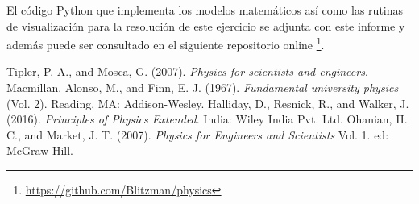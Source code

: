 \documentclass[journal]{IEEEtran}
\begin{document}
El código Python que implementa los modelos matemáticos así como las rutinas de visualización para la resolución de este ejercicio se adjunta con este informe y además puede ser consultado en el siguiente repositorio online \footnote{\url{https://github.com/Blitzman/physics}}.

\ifCLASSOPTIONcaptionsoff
  \newpage
\fi



%
%
%
\begin{thebibliography}{1}

  Tipler, P. A., and Mosca, G. (2007). \emph{Physics for scientists and engineers}. Macmillan.
  Alonso, M., and Finn, E. J. (1967). \emph{Fundamental university physics} (Vol. 2). Reading, MA: Addison-Wesley.
  Halliday, D., Resnick, R., and Walker, J. (2016). \emph{Principles of Physics Extended}. India: Wiley India Pvt. Ltd.
  Ohanian, H. C., and Market, J. T. (2007). \emph{Physics for Engineers and Scientists} Vol. 1. ed: McGraw Hill.

\end{thebibliography}
\end{document}
